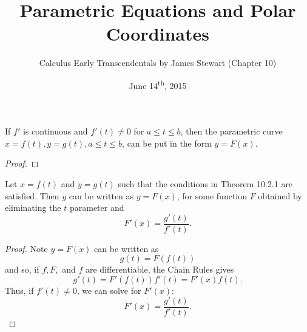 \documentclass[a4paper,11pt]{article}
\title{Parametric Equations and Polar Coordinates}
\author{Calculus Early Transcendentals by James Stewart (Chapter 10)}
\date{June 14\textsuperscript{th}, 2015}
\begin{document}
\maketitle
{}

\begin{outline}

    If \(f'\) is continuous and \(f'(t) \neq 0\) for \(a \leq t \leq b\), then the parametric curve \(x = f(t),
    y = g(t), a \leq t \leq b\), can be put in the form \(y = F(x)\).
    
    \begin{proof}
      
    \end{proof}
    
    Let \(x = f(t)\) and \(y = g(t)\) such that the conditions in Theorem 10.2.1 are satisfied. Then \(y\) can
    be written as \(y = F(x)\), for some function \(F\) obtained by eliminating the \(t\) parameter and 
    \[ F'(x) = \frac{g'(t)}{f'(t)}\text{.} \]
    
    \begin{proof}
      Note \(y = F(x)\) can be written as \[ g(t) = F(f(t)) \] and so, if \(f, F,\) and \(f\) are differentiable, 
      the Chain Rules gives \[ g'(t) = F'(f(t))f'(t) = F'(x)f(t)\text{.} \] Thus, if \(f'(t) \neq 0\), we can 
      solve for \(F'(x)\): \[ F'(x) = \frac{g'(t)}{f'(t)}\text{.} \]
    \end{proof}

\end{outline}
\end{document}
